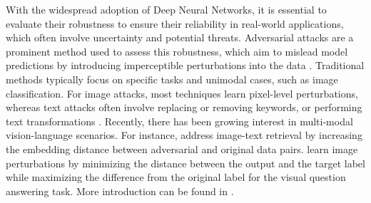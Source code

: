With the widespread adoption of Deep Neural Networks, it is essential to evaluate their robustness to ensure their reliability in real-world applications, which often involve uncertainty and potential threats. Adversarial attacks are a prominent method used to assess this robustness, which aim to mislead model predictions by introducing imperceptible perturbations into the data \cite{szegedy2014intriguing, zhang2023proactive, zhang2021privacy, madry2018towards, moosavi2017universal}. Traditional methods typically focus on specific tasks and unimodal cases, such as image classification. For image attacks, most techniques learn pixel-level perturbations, whereas text attacks often involve replacing or removing keywords, or performing text transformations \cite{li2020bert, jin2020bert, iyyer2018adversarial, naik2018stress, ren2019generating}. Recently, there has been growing interest in multi-modal vision-language scenarios. For instance, \cite{zhang2023proactive, wang2021prototype, zhu2023efficient} address image-text retrieval by increasing the embedding distance between adversarial and original data pairs. \cite{xu2018fooling} learn image perturbations by minimizing the distance between the output and the target label while maximizing the difference from the original label for the visual question answering task. More introduction can be found in \cite{zhangsurvey}.


